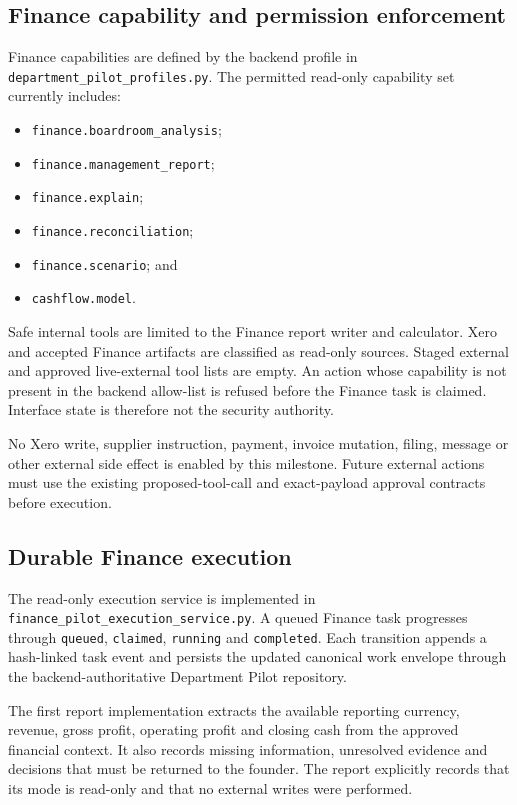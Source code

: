 \subsection{Finance capability and permission enforcement}

Finance capabilities are defined by the backend profile in \texttt{department\_pilot\_profiles.py}.  The permitted read-only capability set currently includes:
\begin{itemize}
  \item \texttt{finance.boardroom\_analysis};
  \item \texttt{finance.management\_report};
  \item \texttt{finance.explain};
  \item \texttt{finance.reconciliation};
  \item \texttt{finance.scenario}; and
  \item \texttt{cashflow.model}.
\end{itemize}

Safe internal tools are limited to the Finance report writer and calculator.  Xero and accepted Finance artifacts are classified as read-only sources.  Staged external and approved live-external tool lists are empty.  An action whose capability is not present in the backend allow-list is refused before the Finance task is claimed.  Interface state is therefore not the security authority.

No Xero write, supplier instruction, payment, invoice mutation, filing, message or other external side effect is enabled by this milestone.  Future external actions must use the existing proposed-tool-call and exact-payload approval contracts before execution.

\subsection{Durable Finance execution}

The read-only execution service is implemented in \texttt{finance\_pilot\_execution\_service.py}.  A queued Finance task progresses through \texttt{queued}, \texttt{claimed}, \texttt{running} and \texttt{completed}.  Each transition appends a hash-linked task event and persists the updated canonical work envelope through the backend-authoritative Department Pilot repository.

The first report implementation extracts the available reporting currency, revenue, gross profit, operating profit and closing cash from the approved financial context.  It also records missing information, unresolved evidence and decisions that must be returned to the founder.  The report explicitly records that its mode is read-only and that no external writes were performed.

